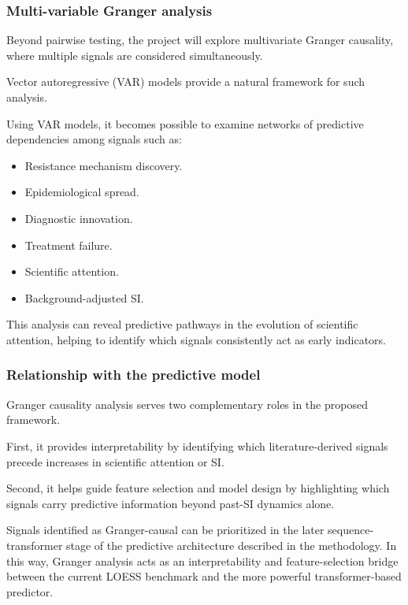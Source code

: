 \documentclass[
]{article}
\providecommand{\tightlist}{%
  \setlength{\itemsep}{0pt}\setlength{\parskip}{0pt}}
\begin{document}
\subsubsection{Multi-variable Granger
analysis}\label{56-multi-variable-granger-analysis}

Beyond pairwise testing, the project will explore multivariate Granger
causality, where multiple signals are considered simultaneously.

Vector autoregressive (VAR) models provide a natural framework for such
analysis.

Using VAR models, it becomes possible to examine networks of predictive
dependencies among signals such as:

\begin{itemize}
\tightlist
\item
  Resistance mechanism discovery.
\item
  Epidemiological spread.
\item
  Diagnostic innovation.
\item
  Treatment failure.
\item
  Scientific attention.
\item
  Background-adjusted SI.
\end{itemize}

This analysis can reveal predictive pathways in the evolution of
scientific attention, helping to identify which signals consistently act
as early indicators.

\subsubsection{Relationship with the predictive
model}\label{57-relationship-with-the-predictive-model}

Granger causality analysis serves two complementary roles in the
proposed framework.

First, it provides interpretability by identifying which
literature-derived signals precede increases in scientific attention or
SI.

Second, it helps guide feature selection and model design by
highlighting which signals carry predictive information beyond past-SI
dynamics alone.

Signals identified as Granger-causal can be prioritized in the later
sequence-transformer stage of the predictive architecture described in
the methodology. In this way, Granger analysis acts as an
interpretability and feature-selection bridge between the current LOESS
benchmark and the more powerful transformer-based predictor.
\end{document}
